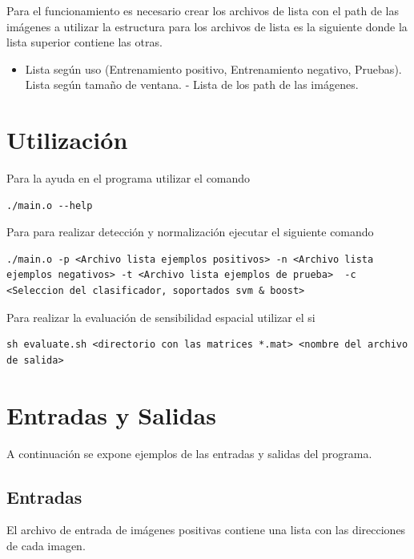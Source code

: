 Para el funcionamiento es necesario crear los archivos de lista con el path de las imágenes a utilizar la estructura para los archivos de lista es la siguiente donde la lista superior contiene las otras.

\begin{itemize}
\item Lista según uso (Entrenamiento positivo, Entrenamiento negativo, Pruebas).
\subitem * Lista según tamaño de ventana.
\subsubitem     - Lista de los path de las imágenes.
\end{itemize}


\section{Utilización}

Para la ayuda en el programa utilizar el comando

\begin{lstlisting}
./main.o --help 
\end{lstlisting}

Para para realizar detección y normalización ejecutar el siguiente comando

\begin{lstlisting}
./main.o -p <Archivo lista ejemplos positivos> -n <Archivo lista ejemplos negativos> -t <Archivo lista ejemplos de prueba>  -c <Seleccion del clasificador, soportados svm & boost>
\end{lstlisting}

Para realizar la evaluación de sensibilidad espacial utilizar el si

\begin{lstlisting}
sh evaluate.sh <directorio con las matrices *.mat> <nombre del archivo de salida>
\end{lstlisting}


\section{Entradas y Salidas}


A continuación se expone ejemplos de las entradas y salidas del programa.

\subsection{Entradas}

El archivo de entrada de imágenes positivas contiene una lista con las direcciones de cada imagen.

